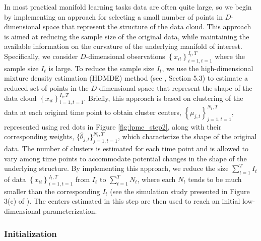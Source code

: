 \documentclass[11pt,reqno]{article}
\theoremstyle{definition}
\begin{document}
In most practical manifold learning tasks data are often quite large, so we begin by implementing an approach for selecting a small number of points in $D$-dimensional space that represent the structure of the data cloud. This approach is aimed at reducing the sample size of the original data, while maintaining the available information on the curvature of the underlying manifold of interest. Specifically, we consider $D$-dimensional observations $\left\{x_{it}\right\}_{i=1, t=1}^{I_t, T}$ where the sample size $I_t$ is large. To reduce the sample size $I_t$, we use the high-dimensional mixture density estimation (HDMDE) method (see \cite{mengPrincipalManifoldEstimation2021}, Section 5.3) to estimate a reduced set of points in the $D$-dimensional space that represent the shape of the data cloud $\left\{x_{it}\right\}_{i=1, t=1}^{I_t, T}$. Briefly, this approach is based on clustering of the data at each original time point to obtain cluster centers, $\left\{\mu_{j, t}\right\}_{j=1, t=1}^{N_t, T}$, represented using red dots in Figure \ref{fig:lpme_step2}, along with their corresponding weights, $\{\hat{\theta}_{j, t}\}_{j=1, t=1}^{N_t, T}$, which characterize the shape of the original data. The number of clusters is estimated for each time point and is allowed to vary among time points to accommodate potential changes in the shape of the underlying structure. By implementing this approach, we reduce the size $\sum_{t=1}^T I_t$ of data $\left\{x_{it}\right\}_{i=1, t=1}^{I_t, T}$ from $I_t$ to $\sum_{t=1}^T N_t$, where each $N_t$ tends to be much smaller than the corresponding $I_t$ (see the simulation study presented in Figure 3(c) of \cite{mengPrincipalManifoldEstimation2021}). The centers estimated in this step are then used to reach an initial low-dimensional parameterization.

\subsubsection{Initialization}
\end{document}
